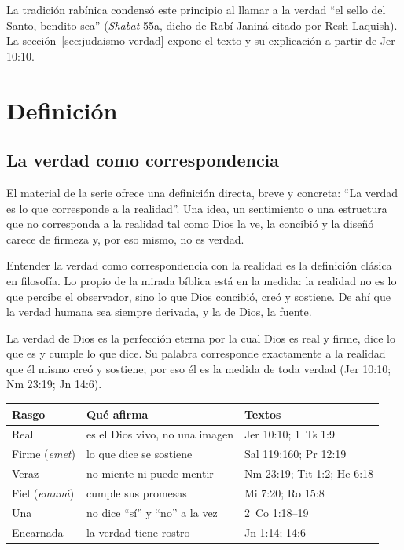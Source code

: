 \documentclass[11pt,letterpaper]{article}
\begin{document}
\begin{nota}[Precisión]
La tradición rabínica condensó este principio al llamar a la verdad ``el sello del Santo, bendito sea'' (\emph{Shabat} 55a, dicho de Rabí Janiná citado por Resh Laquish). La sección~\ref{sec:judaismo-verdad} expone el texto y su explicación a partir de Jer 10:10.
\end{nota}

\section{Definición}

\subsection{La verdad como correspondencia}
El material de la serie ofrece una definición directa, breve y concreta: ``La verdad es lo que corresponde a la realidad''. Una idea, un sentimiento o una estructura que no corresponda a la realidad tal como Dios la ve, la concibió y la diseñó carece de firmeza y, por eso mismo, no es verdad.

\begin{nota}[Precisión]
Entender la verdad como correspondencia con la realidad es la definición clásica en filosofía. Lo propio de la mirada bíblica está en la medida: la realidad no es lo que percibe el observador, sino lo que Dios concibió, creó y sostiene. De ahí que la verdad humana sea siempre derivada, y la de Dios, la fuente.
\end{nota}

\begin{tcolorbox}[colback=papiro,colframe=azul,boxrule=1pt,arc=3pt,fonttitle=\bfseries,title=Definición]
La verdad de Dios es la perfección eterna por la cual Dios es real y firme, dice lo que es y cumple lo que dice. Su palabra corresponde exactamente a la realidad que él mismo creó y sostiene; por eso él es la medida de toda verdad (Jer 10:10; Nm 23:19; Jn 14:6).
\end{tcolorbox}

\begin{center}\small\renewcommand{\arraystretch}{1.2}
\begin{tabular}{@{}L{3.4cm}L{6.6cm}L{4.4cm}@{}}
\toprule
\textbf{Rasgo} & \textbf{Qué afirma} & \textbf{Textos} \\ \midrule
Real & es el Dios vivo, no una imagen & Jer 10:10; 1~Ts 1:9 \\
Firme (\emph{emet}) & lo que dice se sostiene & Sal 119:160; Pr 12:19 \\
Veraz & no miente ni puede mentir & Nm 23:19; Tit 1:2; He 6:18 \\
Fiel (\emph{emuná}) & cumple sus promesas & Mi 7:20; Ro 15:8 \\
Una & no dice ``sí'' y ``no'' a la vez & 2~Co 1:18--19 \\
Encarnada & la verdad tiene rostro & Jn 1:14; 14:6 \\
\bottomrule
\end{tabular}\end{center}
\end{document}
